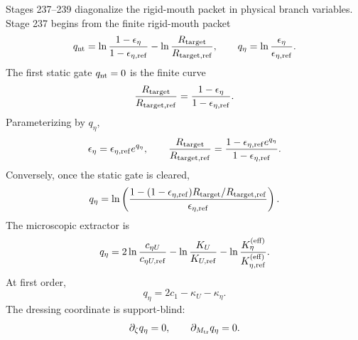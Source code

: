 Stages 237--239 diagonalize the rigid-mouth packet in physical branch variables.  Stage 237 begins from the finite rigid-mouth packet
\begin{equation}
\label{eq:app-part07-rm-finite-packet}
q_{\rm nt}=\ln\frac{1-\epsilon_\eta}{1-\epsilon_{\eta,\rm ref}}
-
\ln\frac{R_{\rm target}}{R_{\rm target,ref}},
\qquad
q_\eta=\ln\frac{\epsilon_\eta}{\epsilon_{\eta,\rm ref}}.
\end{equation}
The first static gate \(q_{\rm nt}=0\) is the finite curve
\begin{equation}
\label{eq:app-part07-static-blind-curve}
\frac{R_{\rm target}}{R_{\rm target,ref}}
=
\frac{1-\epsilon_\eta}{1-\epsilon_{\eta,\rm ref}}.
\end{equation}
Parameterizing by \(q_\eta\),
\begin{equation}
\label{eq:app-part07-static-blind-curve-qeta}
\epsilon_\eta=\epsilon_{\eta,\rm ref}e^{q_\eta},
\qquad
\frac{R_{\rm target}}{R_{\rm target,ref}}
=
\frac{1-\epsilon_{\eta,\rm ref}e^{q_\eta}}{1-\epsilon_{\eta,\rm ref}}.
\end{equation}
Conversely, once the static gate is cleared,
\begin{equation}
\label{eq:app-part07-qeta-from-rtarget}
q_\eta=
\ln\left(
\frac{1-(1-\epsilon_{\eta,\rm ref})R_{\rm target}/R_{\rm target,ref}}
{\epsilon_{\eta,\rm ref}}
\right).
\end{equation}
The microscopic extractor is
\begin{equation}
\label{eq:app-part07-qeta-micro-finite}
q_\eta
=2\ln\frac{c_{\eta U}}{c_{\eta U,\rm ref}}
-
\ln\frac{K_U}{K_{U,\rm ref}}
-
\ln\frac{K_\eta^{(\rm eff)}}{K_{\eta,\rm ref}^{(\rm eff)}}.
\end{equation}
At first order,
\begin{equation}
\label{eq:app-part07-qeta-first-order}
q_\eta=2c_1-\kappa_U-\kappa_\eta.
\end{equation}
The dressing coordinate is support-blind:
\begin{equation}
\label{eq:app-part07-qeta-support-blind}
\partial_\zeta q_\eta=0,
\qquad
\partial_{M_{\rm tr}}q_\eta=0.
\end{equation}


